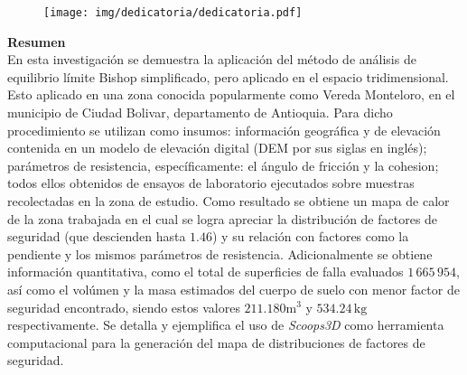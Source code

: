 \newpage
\thispagestyle{empty} \textbf{}\normalsize
\\\\\\%
\\\\
\begin{figure}[H]
\centering
\texttt{[image: img/dedicatoria/dedicatoria.pdf]}
\end{figure}

\newpage{\pagestyle{empty}\cleardoublepage}

\newpage
\textbf{\LARGE Resumen}\\
En esta investigaci\'on se demuestra la aplicaci\'on del m\'etodo de an\'alisis de equilibrio l\'imite Bishop simplificado, pero aplicado en el espacio tridimensional. Esto aplicado en una zona conocida popularmente como Vereda Monteloro, en el municipio de Ciudad Bolivar, departamento de Antioquia. Para dicho procedimiento se utilizan como insumos: informaci\'on geogr\'afica y de elevaci\'on contenida en un modelo de elevaci\'on digital (DEM por sus siglas en ingl\'es); par\'ametros de resistencia, espec\'ificamente: el \'angulo de fricci\'on y la cohesion; todos ellos obtenidos de ensayos de laboratorio ejecutados sobre muestras recolectadas en la zona de estudio. Como resultado se obtiene un mapa de calor de la zona trabajada en el cual se logra apreciar la distribuci\'on de factores de seguridad (que descienden hasta \(1.46\)) y su relaci\'on con factores como la pendiente y los mismos par\'ametros de resistencia. Adicionalmente se obtiene informaci\'on quantitativa, como el total de superficies de falla evaluados \(1\,665\,954\), as\'i como el vol\'umen y la masa estimados del cuerpo de suelo con menor factor de seguridad encontrado, siendo estos valores \(211.180\text{m}^{3}\) y \(534.24\,\text{kg}\) respectivamente.
Se detalla y ejemplifica el uso de \emph{Scoops3D} como herramienta computacional para la generaci\'on del mapa de distribuciones de factores de seguridad. 
\\\\
